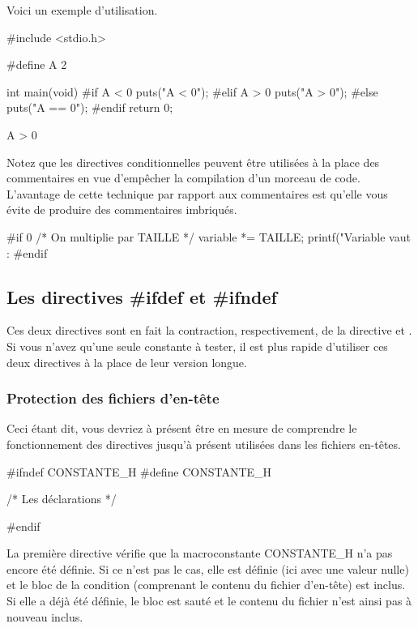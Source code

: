 Voici un exemple d'utilisation.

\begin{C}
#include <stdio.h>

#define A 2

int main(void)
{
#if A < 0
    puts("A < 0");
#elif A > 0
    puts("A > 0");
#else
    puts("A == 0");
#endif
    return 0;
}
\end{C}

\begin{C}
A > 0
\end{C}

\begin{infobox} 
 Notez que les directives
conditionnelles peuvent être utilisées à la place des commentaires en
vue d'empêcher la compilation d'un morceau de code. L'avantage de cette
technique par rapport aux commentaires est qu'elle vous évite de
produire des commentaires imbriqués.
\begin{C}
 #if 0
/* On multiplie par TAILLE */
variable *= TAILLE;
printf("Variable vaut : %
#endif
\end{C}
\end{infobox}


\subsection{Les directives \#ifdef et \#ifndef}
\label{les-directives-ifdef-et-ifndef}

Ces deux directives sont en fait la contraction, respectivement, de la
directive  et . Si vous
n'avez qu'une seule constante à tester, il est plus rapide d'utiliser
ces deux directives à la place de leur version longue.

\subsubsection{Protection des fichiers d'en-tête}
\label{protection-des-fichiers-den-tuxeate}

Ceci étant dit, vous devriez à présent être en mesure de comprendre le
fonctionnement des directives jusqu'à présent utilisées dans les
fichiers en-têtes.

\begin{C}
#ifndef CONSTANTE_H
#define CONSTANTE_H

/* Les déclarations */

#endif
\end{C}

La première directive vérifie que la macroconstante CONSTANTE\_H n'a pas
encore été définie. Si ce n'est pas le cas, elle est définie (ici avec
une valeur nulle) et le bloc de la condition (comprenant le contenu du
fichier d'en-tête) est inclus. Si elle a déjà été définie, le bloc est
sauté et le contenu du fichier n'est ainsi pas à nouveau inclus.

